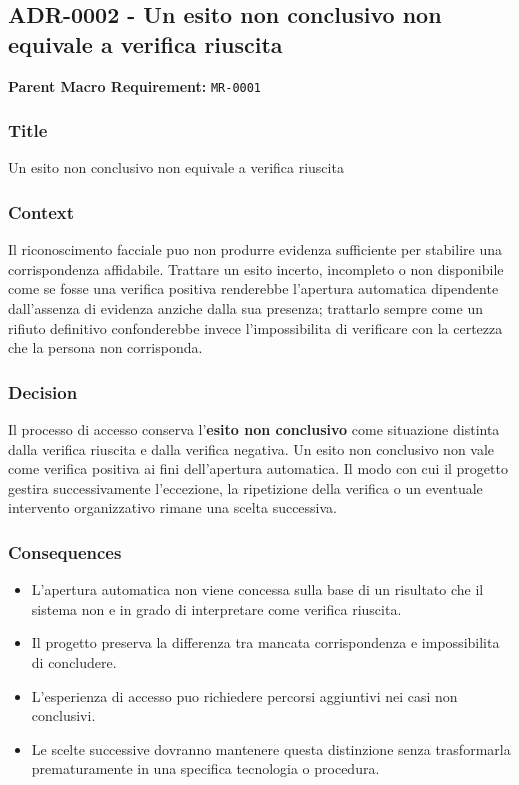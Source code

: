 \documentclass[
  10pt,
]{article}
\providecommand{\tightlist}{%
  \setlength{\itemsep}{0pt}\setlength{\parskip}{0pt}}
\begin{document}
\subsection{ADR-0002 - Un esito non conclusivo non equivale a verifica
riuscita}\label{adr-0002---un-esito-non-conclusivo-non-equivale-a-verifica-riuscita}

\textbf{Parent Macro Requirement:} \texttt{MR-0001}

\subsubsection{Title}\label{title-1}

Un esito non conclusivo non equivale a verifica riuscita

\subsubsection{Context}\label{context-1}

Il riconoscimento facciale puo non produrre evidenza sufficiente per
stabilire una corrispondenza affidabile. Trattare un esito incerto,
incompleto o non disponibile come se fosse una verifica positiva
renderebbe l'apertura automatica dipendente dall'assenza di evidenza
anziche dalla sua presenza; trattarlo sempre come un rifiuto definitivo
confonderebbe invece l'impossibilita di verificare con la certezza che
la persona non corrisponda.

\subsubsection{Decision}\label{decision-1}

Il processo di accesso conserva l'\textbf{esito non conclusivo} come
situazione distinta dalla verifica riuscita e dalla verifica negativa.
Un esito non conclusivo non vale come verifica positiva ai fini
dell'apertura automatica. Il modo con cui il progetto gestira
successivamente l'eccezione, la ripetizione della verifica o un
eventuale intervento organizzativo rimane una scelta successiva.

\subsubsection{Consequences}\label{consequences-1}

\begin{itemize}
\tightlist
\item
  L'apertura automatica non viene concessa sulla base di un risultato
  che il sistema non e in grado di interpretare come verifica riuscita.
\item
  Il progetto preserva la differenza tra mancata corrispondenza e
  impossibilita di concludere.
\item
  L'esperienza di accesso puo richiedere percorsi aggiuntivi nei casi
  non conclusivi.
\item
  Le scelte successive dovranno mantenere questa distinzione senza
  trasformarla prematuramente in una specifica tecnologia o procedura.
\end{itemize}
\end{document}
